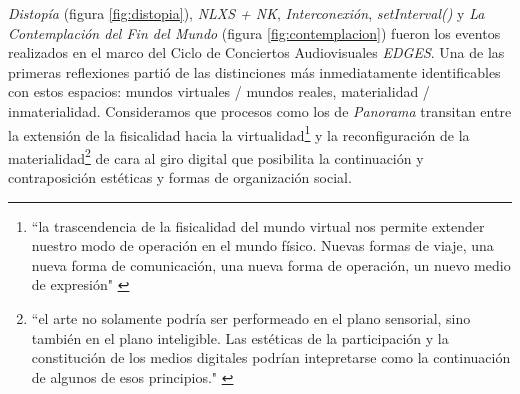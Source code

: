 \textit{Distopía} (figura \ref{fig:distopia}), \textit{NLXS + NK}, \textit{Interconexión}, \textit{setInterval()} y \textit{La Contemplación del Fin del Mundo} (figura \ref{fig:contemplacion}) fueron los eventos realizados en el marco del Ciclo de Conciertos Audiovisuales \textit{EDGES}. Una de las primeras reflexiones partió de las distinciones más inmediatamente identificables con estos espacios: mundos virtuales / mundos reales, materialidad / inmaterialidad. Consideramos que procesos como los de \textit{Panorama} transitan entre la extensión de la fisicalidad hacia la virtualidad\footnote{``la trascendencia de la fisicalidad del mundo virtual nos permite extender nuestro modo de operación en el mundo físico. Nuevas formas de viaje, una nueva forma de comunicación, una nueva forma de operación, un nuevo medio de expresión" \citep[pp.~49]{cyberspace}}  y la reconfiguración de la materialidad\footnote{``el arte no solamente podría ser performeado en el plano sensorial, sino también en el plano inteligible. Las estéticas de la participación y la constitución de los medios digitales podrían intepretarse como la continuación de algunos de esos principios." \citep[pp.~190]{andreasosa}} de cara al giro digital que posibilita la continuación y contraposición estéticas y formas de organización social. 

